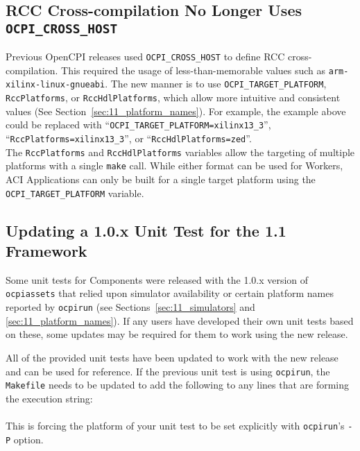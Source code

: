 \subsection{RCC Cross-compilation No Longer Uses \texttt{OCPI\_CROSS\_HOST}}
Previous OpenCPI releases used \texttt{OCPI\_CROSS\_HOST} to define RCC cross-compilation. This required the usage of less-than-memorable values such as \texttt{arm-xilinx-linux-gnueabi}. The new manner is to use \texttt{OCPI\_TARGET\_PLATFORM}, \texttt{RccPlatforms}, or \texttt{RccHdlPlatforms}, which allow more intuitive and consistent values (See Section~\ref{sec:11_platform_names}). For example, the example above could be replaced with ``\texttt{OCPI\_TARGET\_PLATFORM=xilinx13\_3}'', ``\texttt{RccPlatforms=xilinx13\_3}'', or ``\texttt{RccHdlPlatforms=zed}''.\\

The \texttt{RccPlatforms} and \texttt{RccHdlPlatforms} variables allow the targeting of multiple platforms with a single \verb+make+ call.
While either format can be used for Workers, ACI Applications can only be built for a single target platform using the \texttt{OCPI\_TARGET\_PLATFORM} variable.

\subsection{Updating a 1.0.x Unit Test for the 1.1 Framework}
Some unit tests for Components were released with the 1.0.x version of \texttt{ocpiassets} that relied upon simulator availability or certain platform names reported by \texttt{ocpirun} (see Sections~\ref{sec:11_simulators} and \ref{sec:11_platform_names}). If any users have developed their own unit tests based on these, some updates may be required for them to work using the new release.\\

\begin{minipage}{\linewidth}
All of the provided unit tests have been updated to work with the new release and can be used for reference. If the previous unit test is using \texttt{ocpirun}, the \texttt{Makefile} needs to be updated to add the following to any lines that are forming the execution string:\\

\forceindent{}\\

This is forcing the platform of your unit test to be set explicitly with \texttt{ocpirun}'s \texttt{-P} option. \\
\end{minipage}

